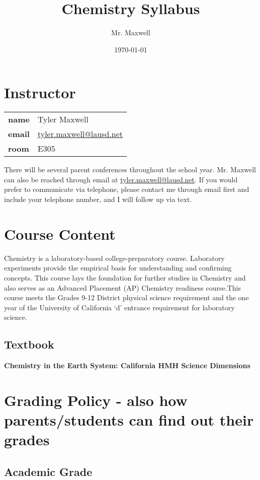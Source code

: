 \documentclass[11pt]{article}
\author{Mr. Maxwell}
\date{\today}
\title{Chemistry Syllabus}
\begin{document}
\section{Instructor}
\label{sec:org29ab16a}

\begin{center}
\begin{tabular}{ll}
\textbf{\textbf{name}} & Tyler Maxwell\\[0pt]
\textbf{\textbf{email}} & \href{mailto:tyler.maxwell@lausd.net}{tyler.maxwell@lausd.net}\\[0pt]
\textbf{\textbf{room}} & E305\\[0pt]
\end{tabular}
\end{center}

There will be several parent conferences throughout the school year. Mr. Maxwell can also be reached through email at \href{mailto:tyler.maxwell@lausd.net}{tyler.maxwell@lausd.net}. If you would prefer to communicate via telephone, please contact me through email first and include your telephone number, and I will follow up via text.

\section{Course Content}
\label{sec:org6c342a3}

Chemistry is a laboratory-based college-preparatory course. Laboratory experiments provide the empirical basis for understanding and confirming concepts. This course lays the foundation for further studies in Chemistry and also serves as an Advanced Placement (AP) Chemistry readiness course.This course meets the Grades 9-12 District physical science requirement and the one year of the University of California ‘d’ entrance requirement for laboratory science.

\subsection{Textbook}
\label{sec:org51cd0e2}

\textbf{\textbf{Chemistry in the Earth System: California HMH Science Dimensions}}

\section{Grading Policy - also how parents/students can find out their grades}
\label{sec:org21a10ac}
\subsection{Academic Grade}
\label{sec:org4864544}
\end{document}
